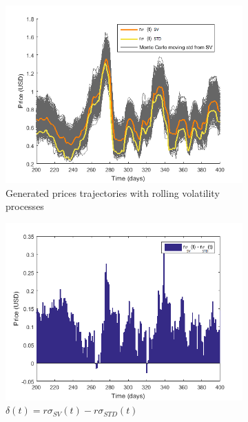 \documentclass[11pt,a4,twosided,singlespacing,titlepagenumber=on]{scrreprt}
\numberwithin{equation}{chapter} %
\theoremstyle{remark}
\begin{document}
\begin{figure}[H]
    \centering
    \begin{subfigure}[t]{0.49\textwidth}
        \centering
        \includegraphics[width=1\textwidth]{model_vol/3}
        \caption{Generated prices trajectories with rolling volatility processes}
        \label{vol_mod_3}
    \end{subfigure}
    \begin{subfigure}[t]{0.49\textwidth}
        \centering
        \includegraphics[width=1\textwidth]{model_vol/5}
        \caption{$\delta(t) = r\sigma_{SV}(t) - r\sigma_{STD}(t)$}
        \label{fig:diff_vol}
    \end{subfigure}
    \begin{subfigure}[t]{0.49\textwidth}

\end{subfigure}
\end{figure}
\end{document}

